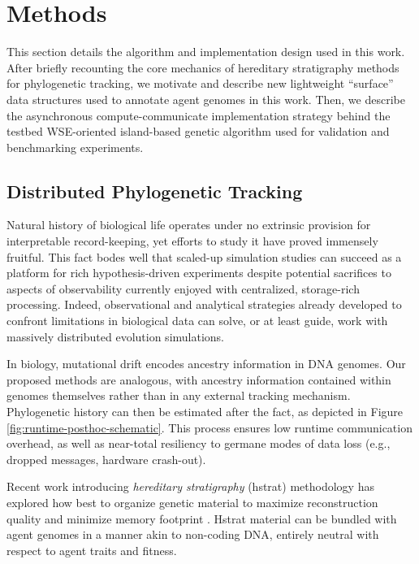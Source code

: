 \section{Methods} \label{sec:methods}

This section details the algorithm and implementation design used in this work.
After briefly recounting the core mechanics of hereditary stratigraphy methods for phylogenetic tracking, we motivate and describe new lightweight ``surface'' data structures used to annotate agent genomes in this work.
Then, we describe the asynchronous compute-communicate implementation strategy behind the testbed WSE-oriented island-based genetic algorithm used for validation and benchmarking experiments.

\subsection{Distributed Phylogenetic Tracking}

Natural history of biological life operates under no extrinsic provision for interpretable record-keeping, yet efforts to study it have proved immensely fruitful.
This fact bodes well that scaled-up simulation studies can succeed as a platform for rich hypothesis-driven experiments despite potential sacrifices to aspects of observability currently enjoyed with centralized, storage-rich processing.
Indeed, observational and analytical strategies already developed to confront limitations in biological data can solve, or at least guide, work with massively distributed evolution simulations.

In biology, mutational drift encodes ancestry information in DNA genomes.
Our proposed methods are analogous, with ancestry information contained within genomes themselves rather than in any external tracking mechanism.
Phylogenetic history can then be estimated after the fact, as depicted in Figure \ref{fig:runtime-posthoc-schematic}.
This process ensures low runtime communication overhead, as well as near-total resiliency to germane modes of data loss (e.g., dropped messages, hardware crash-out).

Recent work introducing \textit{hereditary stratigraphy} (hstrat) methodology has explored how best to organize genetic material to maximize reconstruction quality and minimize memory footprint \citep{moreno2022hstrat, moreno2022hereditary}.
Hstrat material can be bundled with agent genomes in a manner akin to non-coding DNA, entirely neutral with respect to agent traits and fitness.

